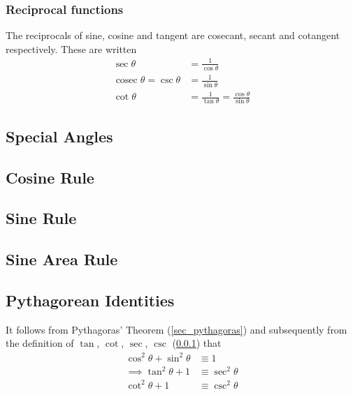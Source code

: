 \documentclass[fleqn,a4paper,11pt]{article}
\begin{document}
    \subsubsection{Reciprocal functions} \label{sec_trig_reciprocal}


    The reciprocals of sine, cosine and tangent are cosecant, secant and
    cotangent respectively. These are written
    \begin{align}
    \sec \theta &= \frac{1}{\cos \theta} \\
    \operatorname{cosec} \theta = \csc \theta
        &= \frac{1}{\sin \theta} \\
    \cot \theta &= \frac{1}{\tan \theta}
        = \frac{\cos \theta}{\sin \theta}
    \end{align}

    \subsection{Special Angles}


    \subsection{Cosine Rule}

    \subsection{Sine Rule}

    \subsection{Sine Area Rule}

    \subsection{Pythagorean Identities} \label{sec_trig_pythag}

    It follows from Pythagoras' Theorem (\ref{sec_pythagoras})
    and subsequently from the definition of
    \(\tan\), \(\cot\), \(\sec\), \(\csc\) (\ref{sec_trig_reciprocal}) that
    \begin{align}
    \cos^2 \theta + \sin^2 \theta &\equiv 1 \\
    \implies \tan^2 \theta + 1 &\equiv \sec^2 \theta \\
    \cot^2 \theta + 1 &\equiv \csc^2 \theta
    \end{align}
\end{document}
